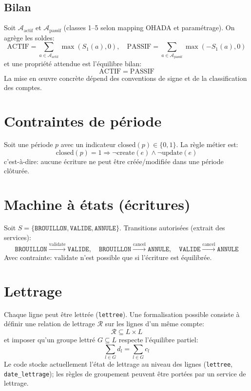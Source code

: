 \documentclass[12pt,a4paper]{report}
\begin{document}
\subsection{Bilan}
Soit \(\mathcal{A}_{\text{actif}}\) et \(\mathcal{A}_{\text{passif}}\) (classes 1--5 selon mapping OHADA et paramétrage).
On agrège les soldes:
\[
\mathrm{ACTIF}=\sum_{a \in \mathcal{A}_{\text{actif}}} \max(S_1(a),0),\quad
\mathrm{PASSIF}=\sum_{a \in \mathcal{A}_{\text{passif}}} \max(-S_1(a),0)
\]
et une propriété attendue est l'équilibre bilan:
\[
\mathrm{ACTIF} = \mathrm{PASSIF}
\]
La mise en œuvre concrète dépend des conventions de signe et de la classification des comptes.

\section{Contraintes de période}
Soit une période \(p\) avec un indicateur \(\mathrm{closed}(p) \in \{0,1\}\).
La règle métier est:
\[
\mathrm{closed}(p)=1 \Rightarrow \neg \mathrm{create}(e) \wedge \neg \mathrm{update}(e)
\]
c'est-à-dire: aucune écriture ne peut être créée/modifiée dans une période clôturée.

\section{Machine à états (écritures)}
Soit \(S = \{\texttt{BROUILLON}, \texttt{VALIDE}, \texttt{ANNULE}\}\).
Transitions autorisées (extrait des services):
\[
\texttt{BROUILLON} \xrightarrow{\mathrm{validate}} \texttt{VALIDE}, \quad
\texttt{BROUILLON} \xrightarrow{\mathrm{cancel}} \texttt{ANNULE}, \quad
\texttt{VALIDE} \xrightarrow{\mathrm{cancel}} \texttt{ANNULE}
\]
Avec contrainte: \(\mathrm{validate}\) n'est possible que si l'écriture est équilibrée.

\section{Lettrage}
Chaque ligne peut être lettrée (\texttt{lettree}).
Une formalisation possible consiste à définir une relation de lettrage \(\mathcal{R}\) sur les lignes d'un même compte:
\[
\mathcal{R} \subseteq L \times L
\]
et imposer qu'un groupe lettré \(G \subseteq L\) respecte l'équilibre partiel:
\[
\sum_{l \in G} d_l = \sum_{l \in G} c_l
\]
Le code stocke actuellement l'état de lettrage au niveau des lignes (\texttt{lettree}, \texttt{date\_lettrage}); les règles de groupement peuvent être portées par un service de lettrage.
\end{document}
